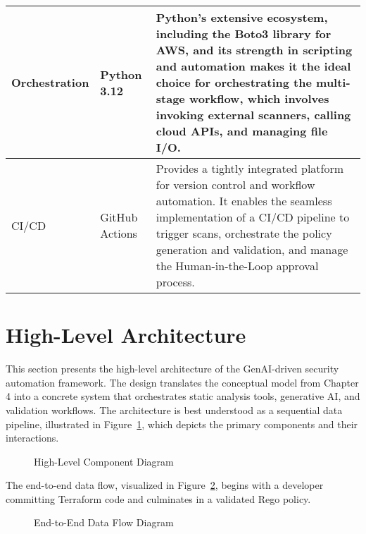 \begin{center}
\begin{tabular}{|l|l|p{7cm}|}
Orchestration & Python 3.12 \cite{noauthor_whats_nodate} & Python's extensive ecosystem, including the Boto3 library for AWS, and its strength in scripting and automation makes it the ideal choice for orchestrating the multi-stage workflow, which involves invoking external scanners, calling cloud APIs, and managing file I/O. \\
\hline
CI/CD & GitHub Actions \cite{noauthor_github_2025} & Provides a tightly integrated platform for version control and workflow automation. It enables the seamless implementation of a CI/CD pipeline to trigger scans, orchestrate the policy generation and validation, and manage the Human-in-the-Loop approval process. \\
\hline
\end{tabular}
\label{tab:tech_stack}
\end{center}

\section{High-Level Architecture}

This section presents the high-level architecture of the GenAI-driven security automation framework. The design translates the conceptual model from Chapter 4 into a concrete system that orchestrates static analysis tools, generative AI, and validation workflows. The architecture is best understood as a sequential data pipeline, illustrated in Figure~\ref{fig:component_diagram}, which depicts the primary components and their interactions.

\begin{figure}[h!]
\centering
\caption{High-Level Component Diagram}
\label{fig:component_diagram}
\end{figure}

The end-to-end data flow, visualized in Figure~\ref{fig:data_flow_diagram}, begins with a developer committing Terraform code and culminates in a validated Rego policy.

\begin{figure}[h!]
\centering
\caption{End-to-End Data Flow Diagram}
\label{fig:data_flow_diagram}
\end{figure}

